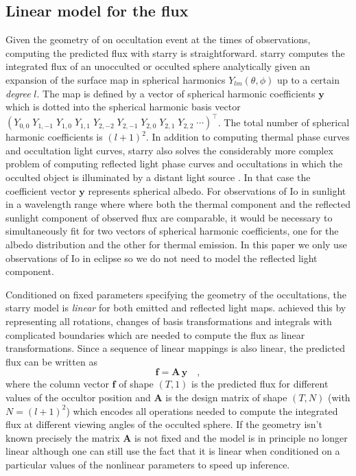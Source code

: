 \documentclass[modern]{aastex62}
\begin{document}
\subsection{Linear model for the flux}
\label{ssec:model_spec}
Given the geometry of on occultation event at the times of observations, computing the predicted flux with \textsf{starry} is straightforward.
\textsf{starry} computes the integrated flux of an unocculted or occulted sphere analytically given an expansion of the surface map in spherical harmonics $Y_{lm}(\theta,\phi)$ up to a certain \emph{degree} $l$.
The map is defined by a vector of spherical harmonic coefficients $\mathbf{y}$ which is dotted into the spherical harmonic basis vector $\left(Y_{0,0}\;Y_{1,-1}\;Y_{1,0}\;Y_{1,1}\;Y_{2,-2}\;Y_{2,-1}\;Y_{2,0}\;Y_{2,1}\;Y_{2,2}\; \cdots\right)^{\top}$.
The total number of spherical harmonic coefficients is $(l+1)^2$.
In addition to computing thermal phase curves and occultation light curves, \textsf{starry} also solves the considerably more complex problem of computing reflected light phase curves and occultations in which the occulted object is illuminated by a distant light source \citep[Luger et al. 2021 in prep][]{}. 
In that case the coefficient vector $\mathbf{y}$ represents spherical albedo.
For observations of Io in sunlight in a wavelength range where where both the thermal component and the reflected sunlight component of observed flux are comparable, it would be necessary to simultaneously fit for two vectors of spherical harmonic coefficients, one for the albedo distribution and the other for thermal emission.
In this paper we only use observations of Io in eclipse so we do not need to model the reflected light component.

Conditioned on fixed parameters specifying the geometry of the occultations, the \textsf{starry} model is \emph{linear} for both emitted and reflected light maps.
\cite{luger2019} achieved this by representing all rotations, changes of basis transformations and integrals with complicated boundaries which are needed to compute the flux as linear transformations.
Since a sequence of linear mappings is also linear, the predicted flux can be written as
\begin{equation}
    \mathbf{f}=\mathbf{A}\,\mathbf{y}
    \quad,
    \label{eq:linear_model}
\end{equation}
where the column vector $\mathbf{f}$ of shape $(T, 1)$ is the predicted flux for different values of the occultor position and $\mathbf{A}$ is the design matrix \citep[see appendix B.1. in ][]{luger2021a} of shape $(T, N)$ (with $N=(l+1)^2$) which encodes all operations needed to compute the integrated flux at different viewing angles of the occulted sphere.
If the geometry isn't known precisely the matrix $\mathbf{A}$ is not fixed and the model is in principle no longer linear although one can still use the fact that it is linear when conditioned on a particular values of the nonlinear parameters to speed up inference.
\end{document}
